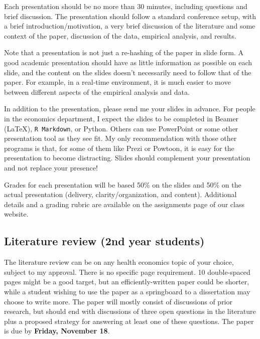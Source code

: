 \documentclass[11pt,]{article}
\begin{document}
Each presentation should be no more than 30 minutes, including questions
and brief discussion. The presentation should follow a standard
conference setup, with a brief introduction/motivation, a very brief
discussion of the literature and some context of the paper, discussion
of the data, empirical analysis, and results.

Note that a presentation is not just a re-hashing of the paper in slide
form. A good academic presentation should have as little information as
possible on each slide, and the content on the slides doesn't
necessarily need to follow that of the paper. For example, in a
real-time environment, it is much easier to move between different
aspects of the empirical analysis and data.

In addition to the presentation, please send me your slides in advance.
For people in the economics department, I expect the slides to be
completed in Beamer (LaTeX), \texttt{R\ Markdown}, or Python. Others can
use PowerPoint or some other presentation tool as they see fit. My only
recommendation with those other programs is that, for some of them like
Prezi or Powtoon, it is easy for the presentation to become distracting.
Slides should complement your presentation and not replace your
presence!

Grades for each presentation will be based 50\% on the slides and 50\%
on the actual presentation (delivery, clarity/organization, and
content). Additional details and a grading rubric are available on the
assignments page of our class website.

\hypertarget{literature-review-2nd-year-students}{%
\subsection{Literature review (2nd year
students)}\label{literature-review-2nd-year-students}}

The literature review can be on any health economics topic of your
choice, subject to my approval. There is no specific page requirement.
10 double-spaced pages might be a good target, but an
efficiently-written paper could be shorter, while a student wishing to
use the paper as a springboard to a dissertation may choose to write
more. The paper will mostly consist of discussions of prior research,
but should end with discussions of three open questions in the
literature plus a proposed strategy for answering at least one of these
questions. The paper is due by \textbf{Friday, November 18}.
\end{document}
